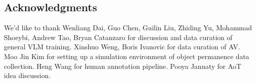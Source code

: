 \subsection{Acknowledgments}
We'd like to thank Wenliang Dai, Guo Chen, Guilin Liu, Zhiding Yu, Mohammad Shoeybi, Andrew Tao, Bryan Catanzaro for discussion and data curation of general VLM training.
Xinshuo Weng, Boris Ivanovic for data curation of AV. Moo Jin Kim for setting up a simulation environment of object permanence data collection. Heng Wang for human annotation pipeline. Pooya Jannaty for AoT idea discussion.
